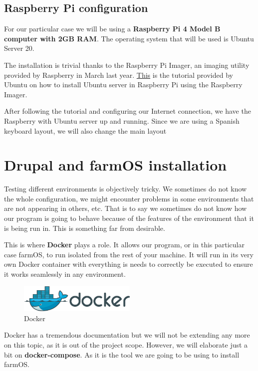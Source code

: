 \subsection{Raspberry Pi configuration}
For our particular case we will be using a \textbf{Raspberry Pi 4 Model B computer with 2GB RAM}. The operating system that will be used is Ubuntu Server 20.

The installation is trivial thanks to the Raspberry Pi Imager, an imaging utility provided by Raspberry in March last year. \href{https://ubuntu.com/tutorials/how-to-install-ubuntu-on-your-raspberry-pi#1-overview}{This} is the tutorial provided by Ubuntu on how to install Ubuntu server in Raspberry Pi using the Raspberry Imager.

After following the tutorial and configuring our Internet connection, we have the Raspberry with Ubuntu server up and running. Since we are using a Spanish keyboard layout, we will also change the main layout
\section{Drupal and farmOS installation}

Testing different environments is objectively tricky. We sometimes do not know the whole configuration, we might encounter problems in some environments that are not appearing in others, etc. That is to say we sometimes do not know how our program is going to behave because of the features of the environment that it is being run in. This is something far from desirable.

\vspace{5mm}
This is where \textbf{Docker}\cite{docker} plays a role. It allows our program, or in this particular case farmOS, to run isolated from the rest of your machine. It will run in its very own Docker container with everything is needs to correctly be executed to ensure it works seamlessly in any environment.

\begin{figure}[H]
    \centering
    \includegraphics[width=0.5\textwidth]{fig/docker_logo.png}
        \caption{Docker}
    \label{fig:docker-logo}
\end{figure}

\vspace{7mm}
Docker has a tremendous documentation but we will not be extending any more on this topic, as it is out of the project scope. However, we will elaborate just a bit on \textbf{docker-compose}\cite{docker-compose}. As it is the tool we are going to be using to install farmOS.

